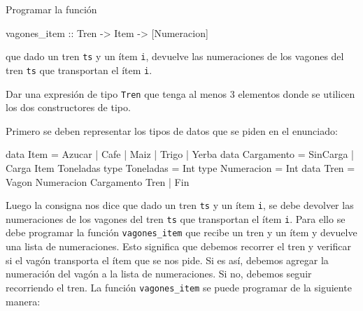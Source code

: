 \documentclass{article}
\begin{document}
\begin{problem}{1}
    Programar la función
    \begin{haskell}
    vagones_item :: Tren -> Item -> [Numeracion]
    \end{haskell}
    que dado un tren \texttt{ts} y un ítem \texttt{i}, devuelve las numeraciones de los vagones del tren \texttt{ts} que transportan el ítem \texttt{i}.
\end{problem}
\begin{problem}{2}
    Dar una expresión de tipo \texttt{Tren} que tenga al menos 3 elementos donde se utilicen los dos constructores de tipo.
\end{problem}

Primero se deben representar los tipos de datos que se piden en el enunciado:
\begin{haskell}
data Item = Azucar | Cafe | Maiz | Trigo | Yerba
data Cargamento = SinCarga | Carga Item Toneladas
type Toneladas = Int
type Numeracion = Int
data Tren = Vagon Numeracion Cargamento Tren | Fin
\end{haskell}
Luego la consigna nos dice que dado un tren \texttt{ts} y un ítem \texttt{i}, se debe devolver las numeraciones de los vagones del tren \texttt{ts} que transportan el ítem \texttt{i}. Para ello se debe programar la función \texttt{vagones\_item} que recibe un tren y un ítem y devuelve una lista de numeraciones. Esto significa que debemos recorrer el tren y verificar si el vagón transporta el ítem que se nos pide. Si es así, debemos agregar la numeración del vagón a la lista de numeraciones. Si no, debemos seguir recorriendo el tren. La función \texttt{vagones\_item} se puede programar de la siguiente manera:
\end{document}
